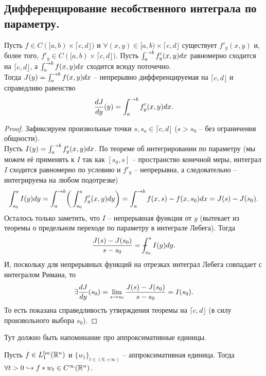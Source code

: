 \subsection{Дифференцирование несобственного интеграла по параметру.}
\begin{theorem}
    Пусть $f \in C([a, b) \times \lceil c, d \rfloor)$ и $\forall (x, y) \in [a, b) \times \lceil c, d \rfloor$ существует $f'_y(x, y)$ и, более того, $f'_y \in C([a, b) \times \lceil c, d \rfloor)$.
    Пусть $\int_a^{\rightarrow b} f'_y(x, y)dx$ равномерно сходится на $\lceil c, d \rfloor$, а $\int_a^{\rightarrow b} f(x, y)dx$ сходится всюду поточечно. \\
    Тогда $J(y) = \int_a^{\rightarrow b} f(x, y)dx$ -- непрерывно дифференцируемая на $\lceil c, d \rfloor$ и справедливо равенство
    \[
        \dfrac{dJ}{dy}(y) = \int_a^{\rightarrow b} f'_y(x, y)dx.
    \]
\end{theorem}
\begin{proof}
    Зафиксируем произвольные точки $s, s_o \in \lceil c, d \rfloor$ ($s > s_0$ -- без ограничения общности). \\
    Пусть $I(y) = \int_a^{\rightarrow b} f'_y(x, y)dx$.
    По теореме об интегрировании по параметру (мы можем её применять к $I$ так как $[s_0, s]$ -- пространство конечной меры, интеграл $I$ сходится равномерно по условию и $f'_y$ -- непрерывна, а следовательно -- интегрируема на любом подотрезке)
    \[
        \int_{s_0}^s I(y)dy = \int_a^{\rightarrow b} \biggr(\int_{s_0}^s f'_y(x, y)dy\biggr) = \int_a^{\rightarrow b} f(x, s) - f(x, s_0)dx = J(s) - J(s_0).
    \]
    Осталось только заметить, что $I$ -- непрерывная функция от $y$ (вытекает из теоремы о предельном переходе по параметру в интеграле Лебега).
    Тогда
    \[
        \dfrac{J(s) - J(s_0)}{s - s_0} = \dashint_{s_0}^s I(y)dy.
    \]
    И, поскольку для непрерывных функций на отрезках интеграл Лебега совпадает с интегралом Римана, то
    \[
        \exists \dfrac{dJ}{dy}(s_0) = \lim\limits_{s \rightarrow s_0} \dfrac{J(s) - J(s_0)}{s - s_0} = I(s_0).
    \]
    То есть показана справедливость утверждения теоремы на $\lceil c, d \rfloor$ (в силу произвольного выбора $s_0$).
\end{proof}
\begin{reminder}
    Тут должно быть напоминание про аппроксимативные единицы.
\end{reminder}
\begin{corollary}
    Пусть $f \in L_1^{loc}(\mathbb{R}^n)$ и $\{w_t\}_{t \in (0, +\infty)}$ -- аппроксимативная единица.
    Тогда $\forall t > 0 \hookrightarrow f * w_t \in C^{\infty}(\mathbb{R}^n)$.
\end{corollary}
